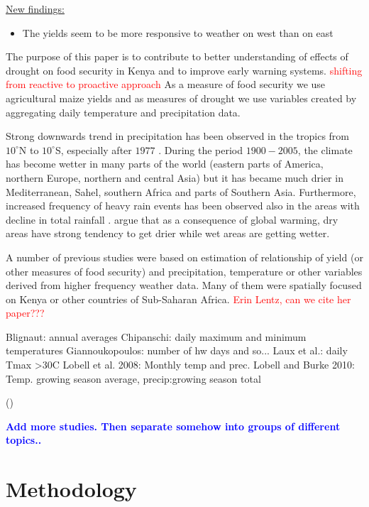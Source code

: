 \documentclass[a4paper,12pt]{article}
\begin{document}
\underline{New findings:}

\begin{itemize}
\item The yields seem to be more responsive to weather on west than on east
\end{itemize}
\normalsize
\FloatBarrier

The purpose of this paper is to contribute to better understanding of effects of drought on food security in Kenya and to improve early warning systems. \textcolor{red}{shifting from reactive to proactive approach} As a measure of food security we use agricultural maize yields and as measures of drought we use variables created by aggregating daily temperature and precipitation data.


 Strong downwards trend in precipitation has been observed in the tropics from $10^\circ$N to $10^\circ$S, especially after $1977$ \citep{IPCCtrenberth}. During the period $1900-2005$, the climate has become wetter in many parts of the world (eastern parts of America, northern Europe, northern and central Asia) but it has became much drier in Mediterranean, Sahel, southern Africa and parts of Southern Asia. Furthermore, increased frequency of heavy rain events has been observed also in the areas with decline in total rainfall \citep{IPCCtrenberth}. \cite{Trenberth2014} argue that as a consequence of global warming, dry areas have strong tendency to get drier while wet areas are getting wetter. 
 
 
A number of previous studies were based on estimation of relationship of yield (or other measures of food security) and precipitation, temperature or other variables derived from higher frequency weather data. Many of them were spatially focused on Kenya or other countries of Sub-Saharan Africa.
\textcolor{red}{Erin Lentz, can we cite her paper???}


Blignaut: annual averages
Chipanschi: daily maximum and minimum temperatures
Giannoukopoulos: number of hw days and so...
Laux et al.: daily Tmax >30C
Lobell et al. 2008: Monthly temp and prec.
Lobell and Burke 2010: Temp. growing season average, precip:growing season total

(\citealt{AbrahaSavage2006,Adejuwon2004,BenMohamed2002,BLIGNAUT2009,
Chipanshi2003,Giannakopoulos2009,LauxEtAl,Leemans1993,LobellEtAl2008,
LobellBurke2010})

\textcolor{blue}{\textbf{Add more studies. Then separate somehow into groups of different topics..}}


\section{Methodology}\label{Method}
\end{document}
